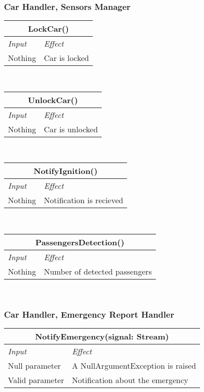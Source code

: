 			\subsubsection*{Car Handler, Sensors Manager} 
			\begin{tabular}{ |l|l| }
				\hline
				\multicolumn{2}{|c|}{LockCar()}\\
				\hline
				\textit{Input}&\textit{Effect}\\ \hline
				Nothing & Car is locked  \\ \hline
			\end{tabular}
			\\
			\begin{tabular}{ |l|l| }
				\hline
				\multicolumn{2}{|c|}{UnlockCar()}\\
				\hline
				\textit{Input}&\textit{Effect}\\ \hline
				Nothing & Car is unlocked  \\ \hline
			\end{tabular}
			\\
			\begin{tabular}{ |l|l| }
				\hline
				\multicolumn{2}{|c|}{NotifyIgnition()}\\
				\hline
				\textit{Input}&\textit{Effect}\\ \hline
				Nothing & Notification is recieved  \\ \hline
			\end{tabular}
			\\
			\begin{tabular}{ |l|l| }
				\hline
				\multicolumn{2}{|c|}{PassengersDetection()}\\
				\hline
				\textit{Input}&\textit{Effect}\\ \hline
				Nothing & Number of detected passengers  \\ \hline
			\end{tabular}
			\\
			
			\subsubsection*{Car Handler, Emergency Report Handler} 
			\begin{tabular}{ |l|l| }
				\hline
				\multicolumn{2}{|c|}{NotifyEmergency(signal: Stream)}\\
				\hline
				\textit{Input}&\textit{Effect}\\ \hline
				Null parameter & A NullArgumentException is raised \\ \hline
				Valid parameter &  Notification about the emergency \\ \hline
			\end{tabular}
			\\	
			
